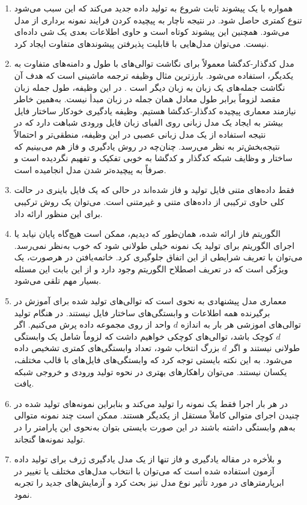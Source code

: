   \begin{enumerate}
  	\item %
  	{
  	همواره با یک پیشوند ثابت شروع به تولید داده جدید می‌کند که این سبب می‌شود تنوع کمتری حاصل شود. در نتیجه ناچار به پیچیده کردن فرایند نمونه برداری از مدل می‌شود. همچنین این پیشوند کوتاه است و حاوی اطلاعات بعدی یک شی داده‌ای نیست. می‌توان مدل‌هایی با قابلیت پذیرفتن پیشوند‌های متفاوت ایجاد کرد.
  	}
  	\item  
  	{
  	مدل کدگذار-کدگشا معمولاً برای نگاشت توالی‌های با طول و دامنه‌های متفاوت به یکدیگر، استفاده می‌شود. بارزترین مثال وظیفه ترجمه ماشینی است که هدف آن نگاشت جمله‌های یک زبان به زبان‌ دیگر است \cite{NIPS2014_5346}. در این وظیفه، طول جمله زبان مقصد لزوماً برابر طول معادل همان جمله در زبان مبدأ نیست. به‌همین خاطر نیازمند معماری پیچیده کدگذار-کدگشا هستیم.
  	وظیفه یادگیری خودکار ساختار فایل بیشتر به ایجاد یک مدل زبانی روی الفبای زبان فایل ورودی شباهت دارد که در نتیجه استفاده از یک مدل زبانی عصبی در این وظیفه، منطقی‌تر و احتمالاً نتیجه‌بخش‌تر به نظر می‌رسد. چنان‌چه در روش یادگیری و فاز هم می‌بینیم که ساختار و وظایف شبکه کدگذار و کدگشا به خوبی تفکیک و تفهیم نگردیده است و صرفاً به پیچیده‌تر شدن مدل انجامیده است. 
    }

	\item  
{
فقط داده‌های متنی فایل تولید و فاز شده‌اند در حالی که یک فایل باینری در حالت کلی حاوی ترکیبی از داده‌های متنی و غیرمتنی است. می‌توان یک روش ترکیبی برای این منظور ارائه داد.
}
	\item  
{
	الگوریتم فاز ارائه شده، همان‌طور که دیدیم، ممکن است هیچ‌گاه پایان نیابد یا اجرای الگوریتم برای تولید یک نمونه خیلی طولانی شود که خوب به‌نظر نمی‌رسد. می‌توان با تعریف شرایطی از این اتفاق جلوگیری کرد. خاتمه‌یافتن در هرصورت، یک ویژگی است که در تعریف اصطلاح الگوریتم وجود دارد و از این بابت این مسئله بسیار مهم تلقی می‌شود.
}
	\item  
{
	معماری مدل پیشنهادی به نحوی است که توالی‌های تولید شده برای آموزش در برگیرنده همه اطلاعات و وابستگی‌های ساختار فایل نیستند. در هنگام تولید توالی‌های اموزشی هر بار به اندازه $ d $ واحد از روی مجموعه داده پرش می‌کنیم.  اگر $ d $ کوچک باشد، توالی‌های کوچکی خواهیم داشت که لزوماً شامل یک وابستگی طولانی نیستند و اگر $ d $ بزرگ انتخاب شود، تعداد وابستگی‌های کمتری تشخیص داده می‌شود. به این نکته بایستی توجه کرد که وابستگی‌های فایل‌های با قالب مختلف، یکسان نیستند. می‌توان راهکارهای بهتری در نحوه تولید ورودی و خروجی شبکه یافت.
}
	\item  
{
	در هر بار اجرا فقط یک نمونه را تولید می‌کند و بنابراین نمونه‌های تولید شده در چنیدن اجرای متوالی کاملاً مستقل از یکدیگر هستند. ممکن است چند نمونه متوالی به‌هم وابستگی داشته باشند در این صورت بایستی بتوان به‌نحوی این پارامتر را در تولید نمونه‌ها گنجاند.  
}

	\item  
{
	و بلأخره در مقاله یادگیری و فاز تنها از یک مدل یادگیری ژرف برای تولید داده آزمون استفاده شده است که می‌توان با انتخاب مدل‌های مختلف یا تغییر در ابرپارمترهای در مورد تأثیر نوع مدل نیز بحث کرد و آزمایش‌های جدید را تجربه نمود.  
}

  \end{enumerate} 


